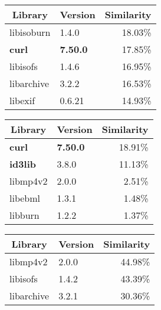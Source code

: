 \documentclass[twocolumn,a4paper]{IEEEtran} %
\newlength{\subfigwidth}
\begin{document}
\begin{table*}[t]
  \small
    \begin{subtable}{\subfigwidth}
      \centering
        \begin{tabular}[c]{ll|r}
        \toprule
        \multicolumn{1}{c}{Library} & \multicolumn{1}{c|}{Version} & \multicolumn{1}{c}{Similarity} \\
        \midrule
        libisoburn &  1.4.0   & 18.03\% \\
        \textbf{curl}       &  \textbf{7.50.0}  & 17.85\% \\
        libisofs   &  1.4.6   & 16.95\% \\
        libarchive &  3.2.2   & 16.53\% \\
        libexif    &  0.6.21  & 14.93\% \\
        \bottomrule
        \end{tabular}
        \caption{\texttt{str1}}
    \end{subtable}
    \vspace{.5cm}
    \begin{subtable}{\subfigwidth}
      \centering
        \begin{tabular}[c]{ll|r}
        \toprule
        \multicolumn{1}{c}{Library} & \multicolumn{1}{c|}{Version} & \multicolumn{1}{c}{Similarity} \\
        \midrule
        \textbf{curl}     &  \textbf{7.50.0} & 18.91\% \\
        \textbf{id3lib}   &  3.8.0  & 11.13\% \\
        libmp4v2 &  2.0.0  &  2.51\% \\
        libebml  &  1.3.1  &  1.48\% \\
        libburn  &  1.2.2  &  1.37\% \\
        \bottomrule
        \end{tabular}
        \caption{\texttt{str2}}
    \end{subtable}
    \begin{subtable}{\subfigwidth}
      \centering
        \begin{tabular}[c]{ll|r}
        \toprule
        \multicolumn{1}{c}{Library} & \multicolumn{1}{c|}{Version} & \multicolumn{1}{c}{Similarity} \\
        \midrule
        libmp4v2   &  2.0.0      & 44.98\% \\
        libisofs   &  1.4.2      & 43.39\% \\
        libarchive &  3.2.1      & 30.36\% \\

\end{tabular}
\end{subtable}
\end{table*}
\end{document}
